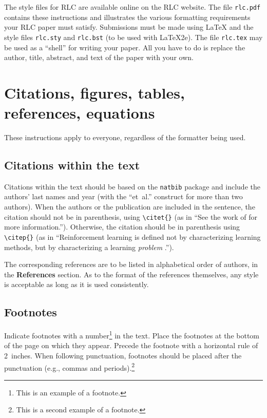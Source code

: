 \documentclass[10pt]{article} %
\begin{document}
The style files for RLC are available online on the RLC website. The file \verb+rlc.pdf+ contains these instructions and illustrates the various formatting requirements your RLC paper must satisfy. Submissions must be made using \LaTeX{} and the style files \verb+rlc.sty+ and \verb+rlc.bst+ (to be used with \LaTeX{}2e). The file \verb+rlc.tex+ may be used as a ``shell'' for writing your paper. All you have to do is replace the author, title, abstract, and text of the paper with your own.

\section{Citations, figures, tables, references, equations}
\label{sec:others}

These instructions apply to everyone, regardless of the formatter being used.

\subsection{Citations within the text}
\label{sec:citations}
Citations within the text should be based on the \texttt{natbib} package and include the authors' last names and year (with the ``et~al.'' construct for more than two authors). When the authors or the publication are included in the sentence, the citation should not be in parenthesis, using \verb|\citet{}| (as in ``See the work of \citet{sutton1998introduction} for more information.''). Otherwise, the citation should be in parenthesis using \verb|\citep{}| (as in ``Reinforcement learning is defined not by characterizing learning methods, but by characterizing a learning \textit{problem} \citep{sutton1998introduction}.'').

The corresponding references are to be listed in alphabetical order of authors, in the \textbf{References} section. As to the format of the references themselves, any style is acceptable as long as it is used consistently.

\subsection{Footnotes}
\label{sec:footnotes}
Indicate footnotes with a number\footnote{This is an example of a footnote.} in the text. Place the footnotes at the bottom of the page on which they appear. Precede the footnote with a horizontal rule of 2~inches. When following punctuation, footnotes should be placed after the punctuation (e.g., commas and periods).\footnote{This is a second example of a footnote.}
\end{document}
